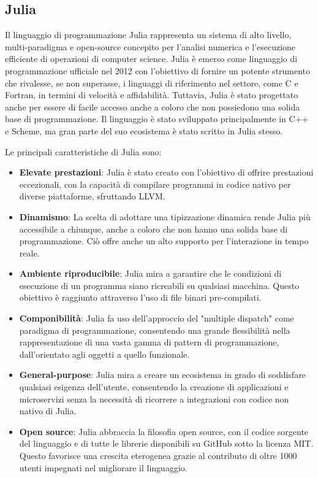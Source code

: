 \subsection{Julia}

Il linguaggio di programmazione Julia rappresenta un sistema di alto 
livello, multi-paradigma e open-source concepito per l'analisi numerica 
e l'esecuzione efficiente di operazioni di computer science. Julia è 
emerso come linguaggio di programmazione ufficiale nel 2012 con 
l'obiettivo di fornire un potente strumento che rivalesse, se non 
superasse, i linguaggi di riferimento nel settore, come C e Fortran, 
in termini di velocità e affidabilità. Tuttavia, Julia è stato progettato 
anche per essere di facile accesso anche a coloro che non possiedono una 
solida base di programmazione. Il linguaggio è stato sviluppato 
principalmente in C++ e Scheme, ma gran parte del suo ecosistema è 
stato scritto in Julia stesso.

Le principali caratteristiche di Julia sono:

\begin{itemize}
    \item \textbf{Elevate prestazioni}: Julia è stato creato con 
    l'obiettivo di offrire prestazioni eccezionali, con la capacità di 
    compilare programmi in codice nativo per diverse piattaforme, 
    sfruttando LLVM.
    \item \textbf{Dinamismo}: La scelta di adottare una tipizzazione 
    dinamica rende Julia più accessibile a chiunque, anche a coloro 
    che non hanno una solida base di programmazione. Ciò offre 
    anche un alto supporto per l'interazione in tempo reale.
    \item \textbf{Ambiente riproducibile}: Julia mira a garantire che le 
    condizioni di esecuzione di un programma siano ricreabili su 
    qualsiasi macchina. Questo obiettivo è raggiunto attraverso l'uso di 
    file binari pre-compilati.
    \item \textbf{Componibilità}: Julia fa uso dell'approccio del 
    "multiple dispatch" come paradigma di programmazione, consentendo 
    una grande flessibilità nella rappresentazione di una vasta gamma 
    di pattern di programmazione, dall'orientato agli oggetti a quello 
    funzionale.
    \item \textbf{General-purpose}: Julia mira a creare un ecosistema in 
    grado di soddisfare qualsiasi esigenza dell'utente, consentendo la 
    creazione di applicazioni e microservizi senza la necessità di 
    ricorrere a integrazioni con codice non nativo di Julia.
    \item \textbf{Open source}: Julia abbraccia la filosofia open source, 
    con il codice sorgente del linguaggio e di tutte le librerie 
    disponibili su GitHub sotto la licenza MIT. Questo favorisce una 
    crescita eterogenea grazie al contributo di oltre 1000 utenti 
    impegnati nel migliorare il linguaggio.
\end{itemize}

